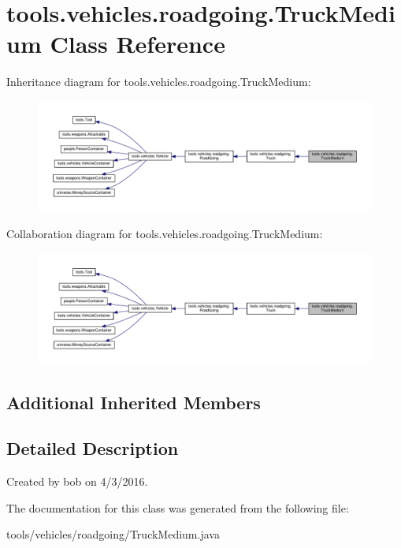 \hypertarget{classtools_1_1vehicles_1_1roadgoing_1_1_truck_medium}{}\section{tools.\+vehicles.\+roadgoing.\+Truck\+Medium Class Reference}
\label{classtools_1_1vehicles_1_1roadgoing_1_1_truck_medium}


Inheritance diagram for tools.\+vehicles.\+roadgoing.\+Truck\+Medium\+:\nopagebreak
\begin{figure}[H]
\begin{center}
\leavevmode
\includegraphics[width=350pt]{classtools_1_1vehicles_1_1roadgoing_1_1_truck_medium__inherit__graph}
\end{center}
\end{figure}


Collaboration diagram for tools.\+vehicles.\+roadgoing.\+Truck\+Medium\+:\nopagebreak
\begin{figure}[H]
\begin{center}
\leavevmode
\includegraphics[width=350pt]{classtools_1_1vehicles_1_1roadgoing_1_1_truck_medium__coll__graph}
\end{center}
\end{figure}
\subsection*{Additional Inherited Members}


\subsection{Detailed Description}
Created by bob on 4/3/2016. 

The documentation for this class was generated from the following file\+:\begin{DoxyCompactItemize}
\item 
tools/vehicles/roadgoing/Truck\+Medium.\+java\end{DoxyCompactItemize}
